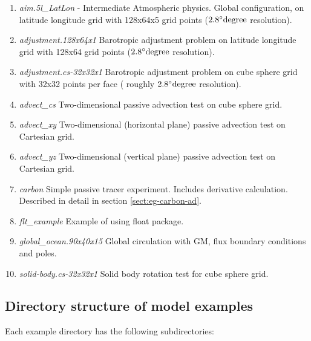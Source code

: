 \begin{enumerate}
\item \textit{aim.5l\_LatLon} - Intermediate Atmospheric physics.
Global configuration, on latitude longitude grid with 128x64x5 grid points
($2.8^\circ{\rm degree}$ resolution).

\item \textit{adjustment.128x64x1} Barotropic adjustment
problem on latitude longitude grid with 128x64 grid points ($2.8^\circ{\rm degree}$ resolution).

\item \textit{adjustment.cs-32x32x1}
Barotropic adjustment
problem on cube sphere grid with 32x32 points per face ( roughly
$2.8^\circ{\rm degree}$ resolution).

\item \textit{advect\_cs} Two-dimensional passive advection test on
cube sphere grid.

\item \textit{advect\_xy} Two-dimensional (horizontal plane) passive advection 
test on Cartesian grid.

\item \textit{advect\_yz} Two-dimensional (vertical plane) passive advection test on Cartesian grid.

\item \textit{carbon} Simple passive tracer experiment. Includes derivative
calculation. Described in detail in section \ref{sect:eg-carbon-ad}.

\item \textit{flt\_example} Example of using float package.

\item \textit{global\_ocean.90x40x15} Global circulation with
GM, flux boundary conditions and poles.

\item \textit{solid-body.cs-32x32x1} Solid body rotation test for cube sphere
grid.

\end{enumerate}

\subsection{Directory structure of model examples}

Each example directory has the following subdirectories:

